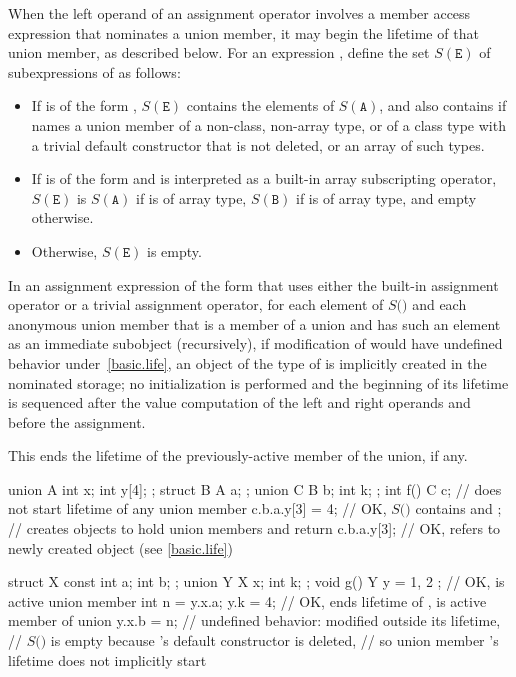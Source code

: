 \pnum
When the left operand of an assignment operator
involves a member access expression
that nominates a union member,
it may begin the lifetime of that union member,
as described below.
For an expression ,
define the set $S(\mathtt{E})$
of subexpressions of 
as follows:
\begin{itemize}
\item
If  is of the form ,
$S(\mathtt{E})$ contains the elements of $S(\mathtt{A})$,
and also contains 
if  names a union member of a non-class, non-array type,
or of a class type with a trivial default constructor that is not deleted,
or an array of such types.
\item
If  is of the form 
and is interpreted as a built-in array subscripting operator,
$S(\mathtt{E})$ is $S(\mathtt{A})$ if  is of array type,
$S(\mathtt{B})$ if  is of array type,
and empty otherwise.
\item
Otherwise, $S(\mathtt{E})$ is empty.
\end{itemize}
In an assignment expression of the form 
that uses either the built-in assignment operator
or a trivial assignment operator,
for each element  of $S($$)$ and
each anonymous union member  that
is a member of a union and
has such an element as an immediate subobject (recursively),
if modification of  would have undefined behavior under~\ref{basic.life},
an object of the type of  is implicitly created
in the nominated storage;
no initialization is performed and
the beginning of its lifetime is sequenced after
the value computation of the left and right operands
and before the assignment.
\begin{note}
This ends the lifetime of the previously-active
member of the union, if any.
\end{note}
\begin{example}
\begin{codeblock}
union A { int x; int y[4]; };
struct B { A a; };
union C { B b; int k; };
int f() {
  C c;                  // does not start lifetime of any union member
  c.b.a.y[3] = 4;       // OK, $S($$)$ contains  and ;
                        // creates objects to hold union members  and 
  return c.b.a.y[3];    // OK,  refers to newly created object (see \ref{basic.life})
}

struct X { const int a; int b; };
union Y { X x; int k; };
void g() {
  Y y = { { 1, 2 } };   // OK,  is active union member
  int n = y.x.a;
  y.k = 4;              // OK, ends lifetime of ,  is active member of union
  y.x.b = n;            // undefined behavior:  modified outside its lifetime,
                        // $S($$)$ is empty because 's default constructor is deleted,
                        // so union member 's lifetime does not implicitly start
}
\end{codeblock}
\end{example}

